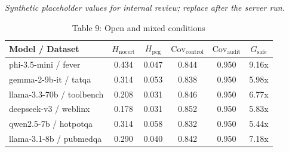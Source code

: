 

\begin{table}[h]
\centering
\small
  \textit{Synthetic placeholder values for internal review; replace after the server run.}
\caption{Table 9: Open and mixed conditions}
\label{tab:r3_open_mixed}
\begin{tabular}{l|cc|cc|c}
\hline
Model / Dataset & $H_{\mathrm{nocert}}$ & $H_{\mathrm{pcg}}$ & $\mathrm{Cov}_{\mathrm{control}}$ & $\mathrm{Cov}_{\mathrm{audit}}$ & $G_{\mathrm{safe}}$ \\
\hline
phi-3.5-mini / fever & 0.434 & 0.047 & 0.844 & 0.950 & 9.16x \\
gemma-2-9b-it / tatqa & 0.314 & 0.053 & 0.838 & 0.950 & 5.98x \\
llama-3.3-70b / toolbench & 0.208 & 0.031 & 0.846 & 0.950 & 6.77x \\
deepseek-v3 / weblinx & 0.178 & 0.031 & 0.852 & 0.950 & 5.83x \\
qwen2.5-7b / hotpotqa & 0.314 & 0.058 & 0.832 & 0.950 & 5.44x \\
llama-3.1-8b / pubmedqa & 0.290 & 0.040 & 0.842 & 0.950 & 7.18x \\
\hline
\end{tabular}
\end{table}
